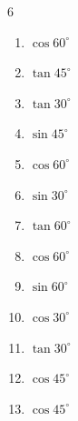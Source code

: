 \begin{multicols}{6}
\begin{enumerate}
  \item $\displaystyle \cos{60^\circ}$


  \item $\displaystyle \tan{45^\circ}$

        \phantom{$\displaystyle =1$}

  \item $\displaystyle \tan{30^\circ}$


  \item $\displaystyle \sin{45^\circ}$


  \item $\displaystyle \cos{60^\circ}$


  \item $\displaystyle \sin{30^\circ}$


  \item $\displaystyle \tan{60^\circ}$


  \item $\displaystyle \cos{60^\circ}$


  \item $\displaystyle \sin{60^\circ}$


  \item $\displaystyle \cos{30^\circ}$


  \item $\displaystyle \tan{30^\circ}$


  \item $\displaystyle \cos{45^\circ}$


  \item $\displaystyle \cos{45^\circ}$


\end{enumerate}
\end{multicols}
